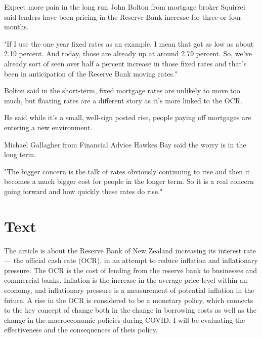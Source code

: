 \documentclass[a4paper,12pt]{article}
\begin{document}
Expect more pain in the long run
John Bolton from mortgage broker Squirrel said lenders have been pricing in the Reserve Bank increase for three or four months.

"If I use the one year fixed rates as an example, I mean that got as low as about 2.19 percent. And today, those are already up at around 2.79 percent. So, we've already sort of seen over half a percent increase in those fixed rates and that's been in anticipation of the Reserve Bank moving rates."

Bolton said in the short-term, fixed mortgage rates are unlikely to move too much, but floating rates are a different story as it's more linked to the OCR.

He said while it's a small, well-sign posted rise, people paying off mortgages are entering a new environment.

Michael Gallagher from Financial Advice Hawkes Bay said the worry is in the long term.

"The bigger concern is the talk of rates obviously continuing to rise and then it becomes a much bigger cost for people in the longer term. So it is a real concern going forward and how quickly these rates do rise."

\newpage

\section*{Text}

The article is about the Reserve Bank of New Zealand increasing its interest rate --- the official cash rate (OCR), in an attempt to reduce inflation and inflationary pressure. The OCR is the cost of lending from the reserve bank to businesses and commercial banks. Inflation is the increase in the average price level within an economy, and inflationary pressure is a measurement of potential inflation in the future. A rise in the OCR is considered to be a monetary policy, which connects to the key concept of change both in the change in borrowing costs as well as the change in the macroeconomic policies during COVID. I will be evaluating the effectiveness and the consequences of theis policy.
\end{document}
